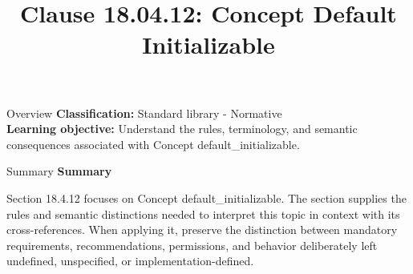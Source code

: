 \documentclass[10pt,letterpaper]{article}
\title{Clause 18.04.12: Concept Default Initializable}
\author{}
\date{}
\begin{document}
\maketitle
\begin{CornellOverviewBox}{Overview}
\textbf{Classification:} Standard library - Normative\\[2pt]
\textbf{Learning objective:} Understand the rules, terminology, and semantic consequences associated with Concept default\_initializable.
\end{CornellOverviewBox}\begin{CornellSummaryBox}{Summary}
{\sffamily\bfseries\color{Accent} Summary}\par\vspace{3pt}Section 18.4.12 focuses on Concept default\_initializable. The section supplies the rules and semantic distinctions needed to interpret this topic in context with its cross-references. When applying it, preserve the distinction between mandatory requirements, recommendations, permissions, and behavior deliberately left undefined, unspecified, or implementation-defined.
\end{CornellSummaryBox}
\end{document}
